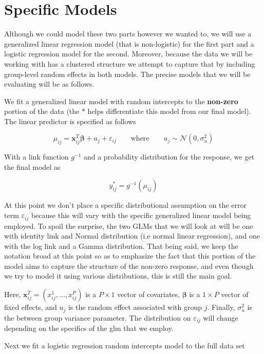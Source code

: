 \documentclass[12pt,twoside]{reedthesis}
\begin{document}
\hypertarget{specificmods}{%
\section{Specific Models}\label{specificmods}}

Although we could model these two parts however we wanted to, we will use a generalized linear regression model (that is non-logistic) for the first part and a logistic regression model for the second. Moreover, because the data we will be working with has a clustered structure we attempt to capture that by including group-level random effects in both models. The precise models that we will be evaluating will be as follows.

We fit a generalized linear model with random intercepts to the \textbf{non-zero} portion of the data (the \(*\) helps differentiate this model from our final model). The linear predictor is specified as follows

\[
\mu_{ij} = \mathbf{x}_{ij}^T\boldsymbol{\beta} + u_j + \varepsilon_{ij} \qquad \text{where} \qquad u_j \sim \mathcal{N}(0, \sigma_{u}^2)
\]

With a link function \(g^{-1}\) and a probability distribution for the response, we get the final model as

\[
y^*_{ij} = g^{-1}(\mu_{ij})
\]

At this point we don't place a specific distributional assumption on the error term \(\varepsilon_{ij}\) because this will vary with the specific generalized linear model being employed. To spoil the surprise, the two GLMs that we will look at will be one with identity link and Normal distribution (i.e normal linear regression), and one with the log link and a Gamma distribution. That being said, we keep the notation broad at this point so as to emphasize the fact that this portion of the model aims to capture the structure of the non-zero response, and even though we try to model it using various distributions, this is still the main goal.

Here, \(\mathbf{x}_{ij}^T = (x^1_{ij}, ..., x^P_{ij})\) is a \(P\times 1\) vector of covariates, \(\boldsymbol{\beta}\) is a \(1\times P\) vector of fixed effects, and \(u_j\) is the random effect associated with group \(j\). Finally, \(\sigma^2_{u}\) is the between group variance parameter. The distribution on \(\varepsilon_{ij}\) will change depending on the specifics of the glm that we employ.

Next we fit a logistic regression random intercepts model to the full data set
\end{document}
